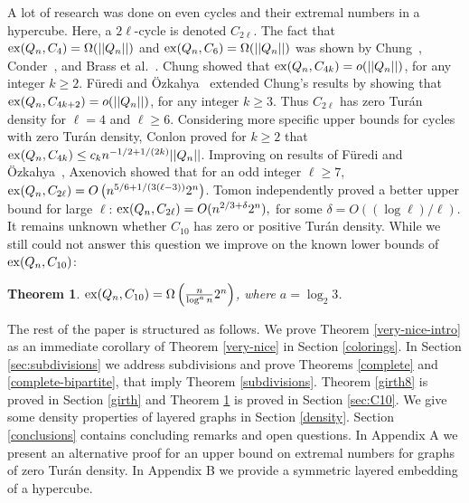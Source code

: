\documentclass[11pt, a4paper]{article}
\newtheorem{theorem}{Theorem}
\newcommand{\ex}{{\rm  ex}}
\begin{document}
 A lot of research was done on  even cycles and their extremal numbers in a hypercube. Here, a $2\ell$-cycle is  denoted $C_{2\ell}$.
 The fact that $\ex(Q_n, C_4) = \Omega(||Q_n||)$ and $\ex(Q_n, C_6) = \Omega(||Q_n||)$  was shown by Chung~\cite{chung}, Conder~\cite{conder}, and Brass {et al.}~\cite{brass}. Chung \cite{chung} showed that $\ex(Q_n, C_{4k})=o(||Q_n||)$, for any integer $k\geq 2$.
F\"uredi and \"Ozkahya~\cite{FO, FO2}   extended Chung's results by showing that  $\ex(Q_n, C_{4k+2})=o(||Q_n||)$, for any integer $k\geq 3$.
Thus $C_{2\ell}$ has zero Tur\'an density for $\ell= 4$ and $\ell\geq 6$. 
Considering more specific upper bounds for cycles with zero Tur\'an density,  Conlon \cite{C}  proved for $k \geq 2$ that
$\ex(Q_n, C_{4k}) \leq c_k  n^{-1/2 + 1/(2k)}  ||Q_n||$.   Improving on results of F\"uredi and \"Ozkahya~\cite{FO, FO2}, Axenovich \cite{MA}  showed that  for an odd integer $\ell \geq 7$, $\ex(Q_n, C_{2\ell})= O\left(n^{5/6 + 1/(3(\ell-3))} 2^n\right)$. Tomon \cite{T} independently proved a better upper bound for large $\ell$:
$\ex(Q_n, C_{2\ell})= O(n^{2/3+ \delta} 2^n), $ for some $\delta = O((\log \ell) /\ell)$.\\  
 
 It remains unknown whether $C_{10}$ has zero or positive Tur\'an density.
 While we still could not answer this question we improve on the known lower bounds of $\ex(Q_n, C_{10})$: 


\begin{theorem} \label{thm:C10}
$\ex(Q_n, C_{10}) = \Omega\left( \frac{n}{\log^a n} 2^n\right)$, where $a = \log_2 3$.
\end{theorem}


The rest of the paper is structured as follows. We prove Theorem \ref{very-nice-intro} as an immediate corollary of Theorem \ref{very-nice} in Section \ref{colorings}.
In Section \ref{sec:subdivisions} we address subdivisions and prove Theorems \ref{complete} and \ref{complete-bipartite}, that imply Theorem \ref{subdivisions}.
Theorem \ref{girth8} is proved   in Section \ref{girth} and Theorem \ref{thm:C10} is proved   in Section \ref{sec:C10}. 
We give some density properties of layered graphs in Section \ref{density}.
Section \ref{conclusions} contains concluding remarks and open questions. In Appendix A we present an alternative proof for an upper bound on extremal numbers for graphs of zero Tur\'an density. In Appendix B we provide a symmetric layered embedding of a hypercube.\\
\end{document}
